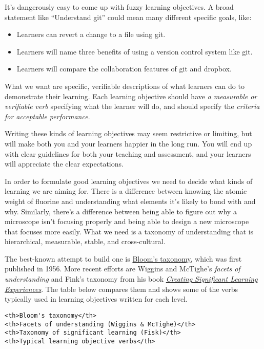 It's dangerously easy to come up with fuzzy learning objectives. A broad
statement like ``Understand git'' could mean many different specific
goals, like:

\begin{itemize}
\itemsep1pt\parskip0pt
\item
  Learners can revert a change to a file using git.
\item
  Learners will name three benefits of using a version control system
  like git.
\item
  Learners will compare the collaboration features of git and dropbox.
\end{itemize}

What we want are specific, verifiable descriptions of what learners can
do to demonstrate their learning. Each learning objective should have
\emph{a measurable or verifiable verb} specifying what the learner will
do, and should specify the \emph{criteria for acceptable performance}.

Writing these kinds of learning objectives may seem restrictive or
limiting, but will make both you and your learners happier in the long
run. You will end up with clear guidelines for both your teaching and
assessment, and your learners will appreciate the clear expectations.

In order to formulate good learning objectives we need to decide what
kinds of learning we are aiming for. There is a difference between
knowing the atomic weight of fluorine and understanding what elements
it's likely to bond with and why. Similarly, there's a difference
between being able to figure out why a microscope isn't focusing
properly and being able to design a new microscope that focuses more
easily. What we need is a taxonomy of understanding that is
hierarchical, measurable, stable, and cross-cultural.

The best-known attempt to build one is
\href{https://en.wikipedia.org/wiki/Bloom's_taxonomy}{Bloom's taxonomy},
which was first published in 1956. More recent efforts are Wiggins and
McTighe's \emph{facets of understanding} and Fink's taxonomy from his
book
\emph{\href{http://www.amazon.com/Creating-Significant-Learning-Experiences-Integrated/dp/1118124251/}{Creating
Significant Learning Experiences}}. The table below compares them and
shows some of the verbs typically used in learning objectives written
for each level.

\begin{verbatim}
<th>Bloom's taxonomy</th>
<th>Facets of understanding (Wiggins & McTighe)</th>
<th>Taxonomy of significant learning (Fisk)</th>
<th>Typical learning objective verbs</th>
\end{verbatim}

